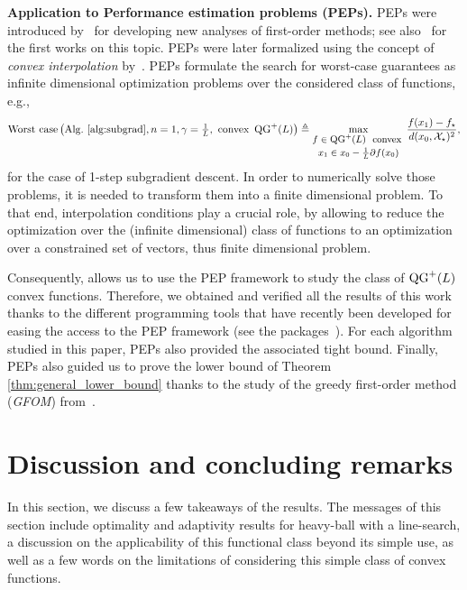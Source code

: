 \textbf{Application to Performance estimation problems (PEPs).} PEPs were introduced by~\citet{drori2014performance} for developing new analyses of first-order methods; see also~\citep{ drori2014contributions, kim2016optimized} for the first works on this topic. PEPs were later formalized using the concept of \emph{convex interpolation} by~\citep{taylor2017smooth, taylor2017exact}.
PEPs formulate the search for worst-case guarantees as infinite dimensional optimization problems over the considered class of functions, e.g.,
\[
\text{Worst case}\left(\text{Alg.}~\ref{alg:subgrad}, n=1, \gamma=\tfrac{1}{L}, \text{ convex } \QG^+(L)  \right) \triangleq \max_{\footnotesize\shortstack{$f\in \QG^+(L)$ \text{ convex } \\ $x_1 \in x_0 -\frac{1}{L} \partial f(x_0)$} } \frac{f(x_1) - f_\star}{ d(x_0,\mathcal X_\star)^2},
\]
for the case of 1-step subgradient descent. In order to numerically solve those problems, it is  needed to transform them into a finite dimensional problem. 
To that end, interpolation conditions play a crucial role, by allowing to reduce the optimization over the (infinite dimensional) class of functions to an optimization over a constrained set of vectors, thus finite dimensional problem.

Consequently,  allows us to use the PEP framework to study the class of $\operatorname{QG}^+(L)$ convex functions. Therefore, we obtained and verified all the results of this work thanks to the different programming tools that have recently been developed for easing the access to the PEP framework (see the packages~\citep{taylor2017performance, goujaud2022pepit}).
For each algorithm studied in this paper, PEPs also provided the associated tight bound.
Finally, PEPs also guided us to prove the lower bound of Theorem \ref{thm:general_lower_bound} thanks to the study of the greedy first-order method (\emph{GFOM}) from~\citep{drori2020efficient}.

\vspace{-0.5em}
\section{Discussion and concluding remarks}
\vspace{-0.5em}
\label{sec:discussion_take_away}
In this section, we discuss a few takeaways of the results. The messages of this section include optimality and adaptivity results for heavy-ball with a line-search, a discussion on the applicability of this functional class beyond its simple use, as well as a few words on the limitations of considering this simple class of convex functions.

